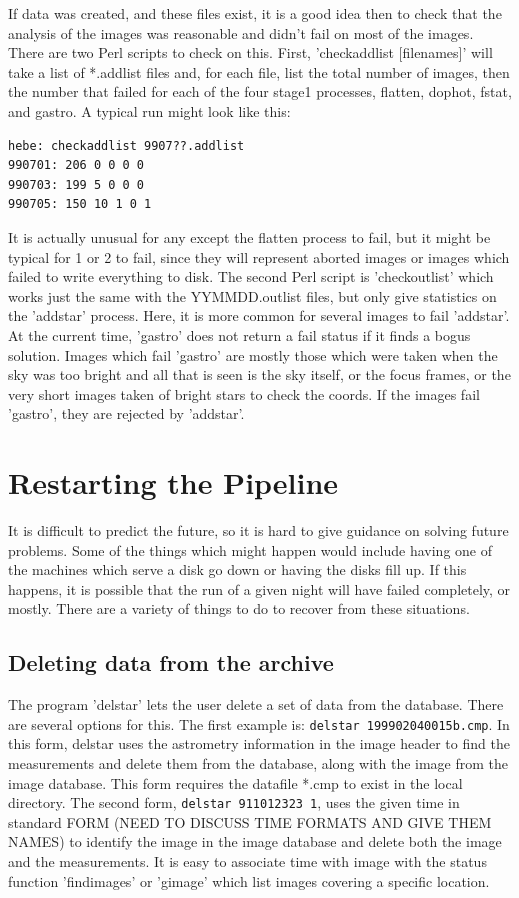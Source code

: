 \documentclass{article}
\begin{document}
If data was created, and these files exist, it is a good idea then to
check that the analysis of the images was reasonable and didn't fail
on most of the images.  There are two Perl scripts to check on this.
First, 'checkaddlist [filenames]' will take a list of *.addlist files
and, for each file, list the total number of images, then the number
that failed for each of the four stage1 processes, flatten, dophot,
fstat, and gastro.  A typical run might look like this:

\begin{verbatim}
hebe: checkaddlist 9907??.addlist
990701: 206 0 0 0 0
990703: 199 5 0 0 0
990705: 150 10 1 0 1
\end{verbatim}

It is actually unusual for any except the flatten process to fail, but
it might be typical for 1 or 2 to fail, since they will represent
aborted images or images which failed to write everything to disk.
The second Perl script is 'checkoutlist' which works just the same
with the YYMMDD.outlist files, but only give statistics on the
'addstar' process.  Here, it is more common for several images to fail
'addstar'.  At the current time, 'gastro' does not return a fail
status if it finds a bogus solution.   Images which fail 'gastro' are
mostly those which were taken when the sky was too bright and all that
is seen is the sky itself, or the focus frames, or the very short
images taken of bright stars to check the coords.  If the images fail
'gastro', they are rejected by 'addstar'.  

\section{Restarting the Pipeline}

It is difficult to predict the future, so it is hard to give guidance
on solving future problems.  Some of the things which might happen
would include having one of the machines which serve a disk go down or
having the disks fill up.  If this happens, it is possible that the
run of a given night will have failed completely, or mostly.  There
are a variety of things to do to recover from these situations.

\subsection{Deleting data from the archive}

The program 'delstar' lets the user delete a set of data from the
database.  There are several options for this.  The first example is:
{\tt delstar 199902040015b.cmp}.  In this form, delstar uses the
astrometry information in the image header to find the measurements
and delete them from the database, along with the image from the image
database.  This form requires the datafile *.cmp to exist in the local
directory.  The second form, {\tt delstar 911012323 1}, uses the given
time in standard FORM (NEED TO DISCUSS TIME FORMATS AND GIVE THEM
NAMES) to identify the image in the image database and delete both the
image and the measurements.  It is easy to associate time with image
with the status function 'findimages' or 'gimage' which list images
covering a specific location.
\end{document}
